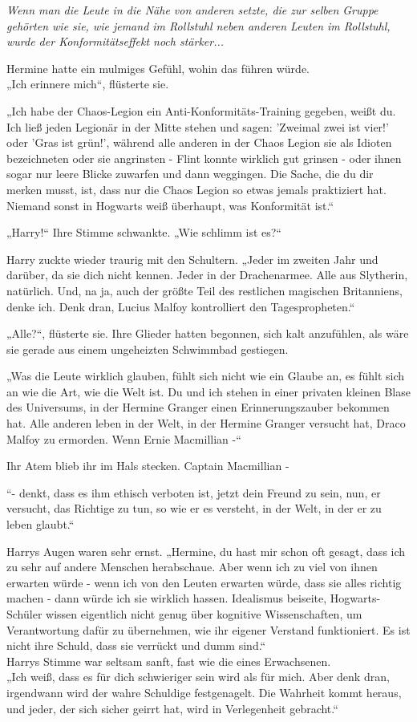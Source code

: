 {\emph{Wenn man die Leute in die Nähe von anderen setzte, die zur selben Gruppe gehörten wie sie, wie jemand im Rollstuhl neben anderen Leuten im Rollstuhl, wurde der Konformitätseffekt noch stärker...}

Hermine hatte ein mulmiges Gefühl, wohin das führen würde.\\ „Ich erinnere mich“, flüsterte sie.

„Ich habe der Chaos-Legion ein Anti-Konformitäts-Training gegeben, weißt du. Ich ließ jeden Legionär in der Mitte stehen und sagen: 'Zweimal zwei ist vier!' oder 'Gras ist grün!', während alle anderen in der Chaos Legion sie als Idioten bezeichneten oder sie angrinsten - Flint konnte wirklich gut grinsen - oder ihnen sogar nur leere Blicke zuwarfen und dann weggingen. Die Sache, die du dir merken musst, ist, dass nur die Chaos Legion so etwas jemals praktiziert hat. Niemand sonst in Hogwarts weiß überhaupt, was Konformität ist.“

„Harry!“ Ihre Stimme schwankte. „Wie schlimm ist es?“

Harry zuckte wieder traurig mit den Schultern. „Jeder im zweiten Jahr und darüber, da sie dich nicht kennen. Jeder in der Drachenarmee. Alle aus Slytherin, natürlich. Und, na ja, auch der größte Teil des restlichen magischen Britanniens, denke ich. Denk dran, Lucius Malfoy kontrolliert den Tagespropheten.“

„Alle?“, flüsterte sie. Ihre Glieder hatten begonnen, sich kalt anzufühlen, als wäre sie gerade aus einem ungeheizten Schwimmbad gestiegen.

„Was die Leute wirklich glauben, fühlt sich nicht wie ein Glaube an, es fühlt sich an wie die Art, wie die Welt ist. Du und ich stehen in einer privaten kleinen Blase des Universums, in der Hermine Granger einen Erinnerungszauber bekommen hat. Alle anderen leben in der Welt, in der Hermine Granger versucht hat, Draco Malfoy zu ermorden. Wenn Ernie Macmillian -“

Ihr Atem blieb ihr im Hals stecken. Captain Macmillian -

“- denkt, dass es ihm ethisch verboten ist, jetzt dein Freund zu sein, nun, er versucht, das Richtige zu tun, so wie er es versteht, in der Welt, in der er zu leben glaubt.“

Harrys Augen waren sehr ernst. „Hermine, du hast mir schon oft gesagt, dass ich zu sehr auf andere Menschen herabschaue. Aber wenn ich zu viel von ihnen erwarten würde - wenn ich von den Leuten erwarten würde, dass sie alles richtig machen - dann würde ich sie wirklich hassen. Idealismus beiseite, Hogwarts-Schüler wissen eigentlich nicht genug über kognitive Wissenschaften, um Verantwortung dafür zu übernehmen, wie ihr eigener Verstand funktioniert. Es ist nicht ihre Schuld, dass sie verrückt und dumm sind.“\\ Harrys Stimme war seltsam sanft, fast wie die eines Erwachsenen.\\ „Ich weiß, dass es für dich schwieriger sein wird als für mich. Aber denk dran, irgendwann wird der wahre Schuldige festgenagelt. Die Wahrheit kommt heraus, und jeder, der sich sicher geirrt hat, wird in Verlegenheit gebracht.“

}
